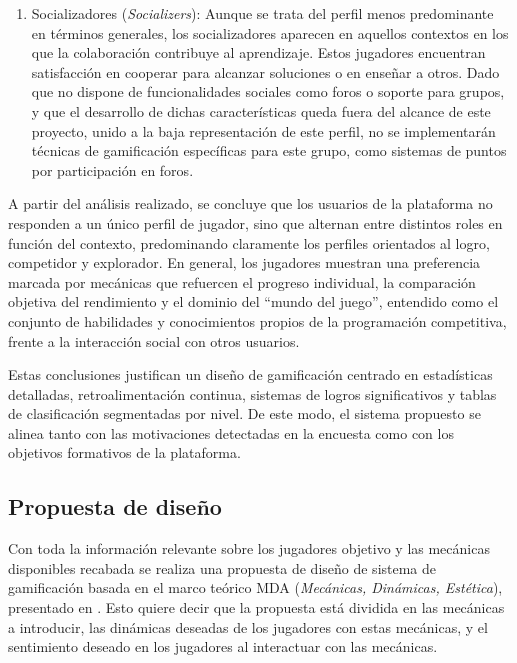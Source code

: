 \begin{enumerate}
    \item Socializadores (\textit{Socializers}): Aunque se trata del perfil menos predominante en términos generales, los socializadores aparecen en aquellos contextos en los que la colaboración contribuye al aprendizaje. Estos jugadores encuentran satisfacción en cooperar para alcanzar soluciones o en enseñar a otros. Dado que \aer no dispone de funcionalidades sociales como foros o soporte para grupos, y que el desarrollo de dichas características queda fuera del alcance de este proyecto, unido a la baja representación de este perfil, no se implementarán técnicas de gamificación específicas para este grupo, como sistemas de puntos por participación en foros.
\end{enumerate}

A partir del análisis realizado, se concluye que los usuarios de la plataforma no responden a un único perfil de jugador, sino que alternan entre distintos roles en función del contexto, predominando claramente los perfiles orientados al logro, competidor y explorador. En general, los jugadores muestran una preferencia marcada por mecánicas que refuercen el progreso individual, la comparación objetiva del rendimiento y el dominio del \enquote{mundo del juego}, entendido como el conjunto de habilidades y conocimientos propios de la programación competitiva, frente a la interacción social con otros usuarios.

Estas conclusiones justifican un diseño de gamificación centrado en estadísticas detalladas, retroalimentación continua, sistemas de logros significativos y tablas de clasificación segmentadas por nivel. De este modo, el sistema propuesto se alinea tanto con las motivaciones detectadas en la encuesta como con los objetivos formativos de la plataforma.

\subsection{Propuesta de diseño}

Con toda la información relevante sobre los jugadores objetivo y las mecánicas disponibles recabada se realiza una propuesta de diseño de sistema de gamificación basada en el marco teórico MDA (\textit{Mecánicas, Dinámicas, Estética}), presentado en \cite{Zichermann_Cunningham_2011}.  Esto quiere decir que la propuesta está dividida en las mecánicas a introducir, las dinámicas deseadas de los jugadores con estas mecánicas, y el sentimiento deseado en los jugadores al interactuar con las mecánicas. 

